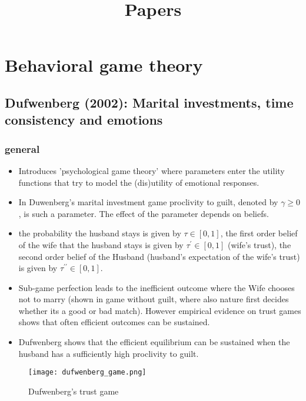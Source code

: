\documentclass[12pt]{article}
\title{Papers}
\date{}
\author{}
\theoremstyle{break}
\numberwithin{theorem}{subsection}
\numberwithin{lemma}{subsection}
\numberwithin{corollary}{subsection}
\numberwithin{equation}{subsection}
\begin{document}
\section{Behavioral game theory}

\subsection{Dufwenberg (2002): Marital investments, time consistency and emotions}

\subsubsection{general}
\begin{itemize}
    \item Introduces 'psychological game theory' where parameters enter the utility functions that try to model the (dis)utility of emotional responses.
    \item In Duwenberg's marital investment game proclivity to guilt, denoted by $\gamma \geq 0$, is such a parameter. The effect of the parameter depends on beliefs.
    \item the probability the husband stays is given by $\tau \in [0,1]$, the first order belief of the wife that the husband stays is given by $\tau^{\prime} \in [0,1]$ (wife's trust), the second order belief of the Husband (husband's expectation of the wife's trust) is given by $\tau^{\prime\prime} \in [0,1]$.
    \item Sub-game perfection leads to the inefficient outcome where the Wife chooses not to marry (shown in game without guilt, where also nature first decides whether its a good or bad match). However empirical evidence on trust games shows that often efficient outcomes can be sustained.
    \item Dufwenberg shows that the efficient equilibrium can be sustained when the husband has a  sufficiently high proclivity to guilt.
\end{itemize}

\begin{figure}[H]
    \centering
    \texttt{[image: dufwenberg\_game.png]}
    \caption{Dufwenberg's trust game}
    \label{combine}
\end{figure}
\end{document}
